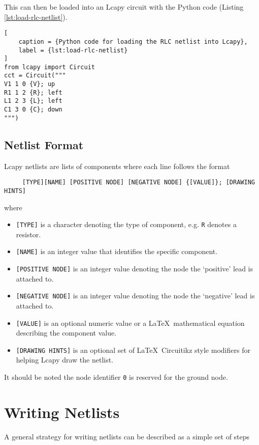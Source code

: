 \documentclass{article}
\begin{document}
This can then be loaded into an Lcapy circuit with the Python code (Listing \ref{lst:load-rlc-netlist}).

\begin{lstlisting}[
    caption = {Python code for loading the RLC netlist into Lcapy},
    label = {lst:load-rlc-netlist}
]
from lcapy import Circuit 
cct = Circuit("""
V1 1 0 {V}; up
R1 1 2 {R}; left
L1 2 3 {L}; left
C1 3 0 {C}; down
""")
\end{lstlisting}

\subsection*{Netlist Format}

Lcapy netlists are lists of components where each line follows the format

\texttt{
\ \ \ \ [TYPE][NAME] [POSITIVE NODE] [NEGATIVE NODE] \{[VALUE]\}; [DRAWING HINTS]
}

where 

\begin{itemize}
    \item[] \texttt{[TYPE]} is a character denoting the type of component, e.g. \texttt{R} denotes a resistor.
    \item[] \texttt{[NAME]} is an integer value that identifies the specific component.
    \item[] \texttt{[POSITIVE NODE]} is an integer value denoting the node the `positive' lead is attached to.
    \item[] \texttt{[NEGATIVE NODE]} is an integer value denoting the node the `negative' lead is attached to.
    \item[] \texttt{[VALUE]} is an optional numeric value or a \LaTeX\ mathematical equation describing the component value.
    \item[] \texttt{[DRAWING HINTS]} is an optional set of \LaTeX\ Circuitikz style modifiers for helping Lcapy draw the netlist.
\end{itemize}
    
It should be noted the node identifier \texttt{0} is reserved for the ground node.

\section*{Writing Netlists}

A general strategy for writing netlists can be described as a simple set of steps 
\end{document}
